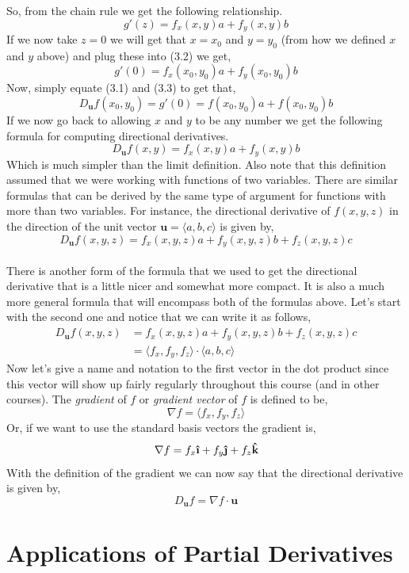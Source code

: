 \documentclass[10pt,reqno]{book}
\theoremstyle{definition}
\renewcommand{\vec}[1]{\mathbf{#1}}
\newcommand{\uvec}[1]{\boldsymbol{\hat{\textbf{#1}}}}
\begin{document}
	So, from the chain rule we get the following relationship.
	\begin{equation}
		g'(z) = f_x(x,y)a + f_y(x,y)b
	\end{equation}
	If we now take $ z = 0 $ we will get that $ x = x_0 $ and $ y = y_0 $ (from how we defined $ x $ and $ y $ above) and plug these into (3.2) we get,
	\begin{equation}
		g'(0) = f_x(x_0,y_0)a + f_y(x_0,y_0)b
	\end{equation}
	Now, simply equate (3.1) and (3.3) to get that,
	\[ D_{\vec{u}} f(x_0,y_0) = g'(0) = f(x_0,y_0)a + f(x_0,y_0)b \]
	If we now go back to allowing $ x $ and $ y $ to be any number we get the following formula for computing directional derivatives.
	\[ D_{\vec{u}} f(x,y) = f_x(x,y)a + f_y(x,y)b \]
	Which is much simpler than the limit definition. Also note that this definition assumed that we were working with functions of two variables. There are similar formulas that can be derived by the same type of argument for functions with more than two variables. For instance, the directional derivative of $ f(x,y,z) $ in the direction of the unit vector $ \vec{u} = \langle a,b,c \rangle $ is given by,
	\[ D_{\vec{u}} f(x,y,z) = f_x(x,y,z)a + f_y(x,y,z)b + f_z(x,y,z)c \]\\
	There is another form of the formula that we used to get the directional derivative that is a little nicer and somewhat more compact.  It is also a much more general formula that will encompass both of the formulas above. Let's start with the second one and notice that we can write it as follows,
	\begin{align*}
		D_{\vec{u}} f(x,y,z) &= f_x(x,y,z)a + f_y(x,y,z)b + f_z(x,y,z)c\\
		&= \langle f_x,f_y,f_z \rangle \cdot \langle a,b,c \rangle		
	\end{align*}
	Now let's give a name and notation to the first vector in the dot product since this vector will show up fairly regularly throughout this course (and in other courses). The \textit{gradient} of $ f $ or \textit{gradient vector} of $ f $ is defined to be,
	\[ \nabla f = \langle f_x,f_y,f_z \rangle   \]
	Or, if we want to use the standard basis vectors the gradient is,
	\[ \nabla f = f_x\uvec{\i} + f_y\uvec{\j} + f_z \uvec{k} \]
	With the definition of the gradient we can now say that the directional derivative is given by,
	\[ D_{\vec{u}} f = \nabla f \cdot \vec{u} \]
	
	
	\chapter{Applications of Partial Derivatives}
	
\end{document}
